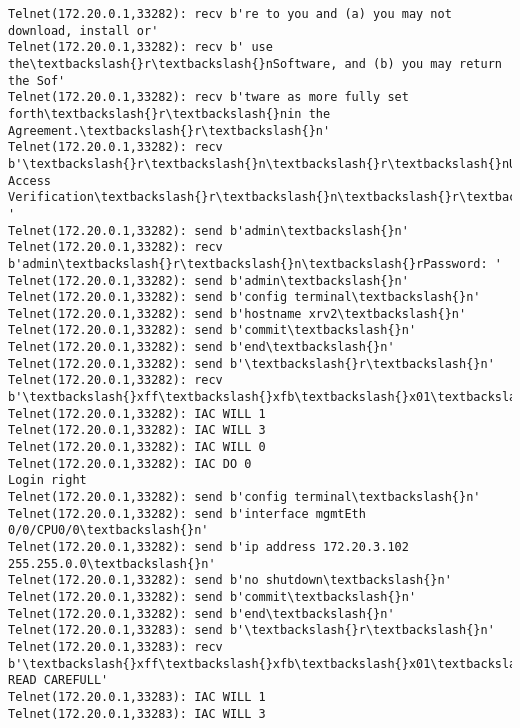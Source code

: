 \documentclass[11pt]{article}
\begin{document}
\begin{Verbatim}[commandchars=\\\{\}]
Telnet(172.20.0.1,33282): recv b're to you and (a) you may not download, install or'
Telnet(172.20.0.1,33282): recv b' use the\textbackslash{}r\textbackslash{}nSoftware, and (b) you may return the Sof'
Telnet(172.20.0.1,33282): recv b'tware as more fully set forth\textbackslash{}r\textbackslash{}nin the Agreement.\textbackslash{}r\textbackslash{}n'
Telnet(172.20.0.1,33282): recv b'\textbackslash{}r\textbackslash{}n\textbackslash{}r\textbackslash{}nUser Access Verification\textbackslash{}r\textbackslash{}n\textbackslash{}r\textbackslash{}nUsername: '
Telnet(172.20.0.1,33282): send b'admin\textbackslash{}n'
Telnet(172.20.0.1,33282): recv b'admin\textbackslash{}r\textbackslash{}n\textbackslash{}rPassword: '
Telnet(172.20.0.1,33282): send b'admin\textbackslash{}n'
Telnet(172.20.0.1,33282): send b'config terminal\textbackslash{}n'
Telnet(172.20.0.1,33282): send b'hostname xrv2\textbackslash{}n'
Telnet(172.20.0.1,33282): send b'commit\textbackslash{}n'
Telnet(172.20.0.1,33282): send b'end\textbackslash{}n'
Telnet(172.20.0.1,33282): send b'\textbackslash{}r\textbackslash{}n'
Telnet(172.20.0.1,33282): recv b'\textbackslash{}xff\textbackslash{}xfb\textbackslash{}x01\textbackslash{}xff\textbackslash{}xfb\textbackslash{}x03\textbackslash{}xff\textbackslash{}xfb\textbackslash{}x00\textbackslash{}xff\textbackslash{}xfd\textbackslash{}x00\textbackslash{}x1b]0;xrv2\textbackslash{}x07\textbackslash{}r\textbackslash{}n\textbackslash{}rRP/0/0/CPU0:xrv2\#\textbackslash{}r\textbackslash{}n\textbackslash{}rRP/0/0'
Telnet(172.20.0.1,33282): IAC WILL 1
Telnet(172.20.0.1,33282): IAC WILL 3
Telnet(172.20.0.1,33282): IAC WILL 0
Telnet(172.20.0.1,33282): IAC DO 0
Login right
Telnet(172.20.0.1,33282): send b'config terminal\textbackslash{}n'
Telnet(172.20.0.1,33282): send b'interface mgmtEth 0/0/CPU0/0\textbackslash{}n'
Telnet(172.20.0.1,33282): send b'ip address 172.20.3.102 255.255.0.0\textbackslash{}n'
Telnet(172.20.0.1,33282): send b'no shutdown\textbackslash{}n'
Telnet(172.20.0.1,33282): send b'commit\textbackslash{}n'
Telnet(172.20.0.1,33282): send b'end\textbackslash{}n'
Telnet(172.20.0.1,33283): send b'\textbackslash{}r\textbackslash{}n'
Telnet(172.20.0.1,33283): recv b'\textbackslash{}xff\textbackslash{}xfb\textbackslash{}x01\textbackslash{}xff\textbackslash{}xfb\textbackslash{}x03\textbackslash{}xff\textbackslash{}xfb\textbackslash{}x00\textbackslash{}xff\textbackslash{}xfd\textbackslash{}x00\textbackslash{}x1b]0;xrv3\textbackslash{}x07\textbackslash{}r\textbackslash{}n\textbackslash{}r\textbackslash{}nIMPORTANT:  READ CAREFULL'
Telnet(172.20.0.1,33283): IAC WILL 1
Telnet(172.20.0.1,33283): IAC WILL 3

\end{Verbatim}
\end{document}
